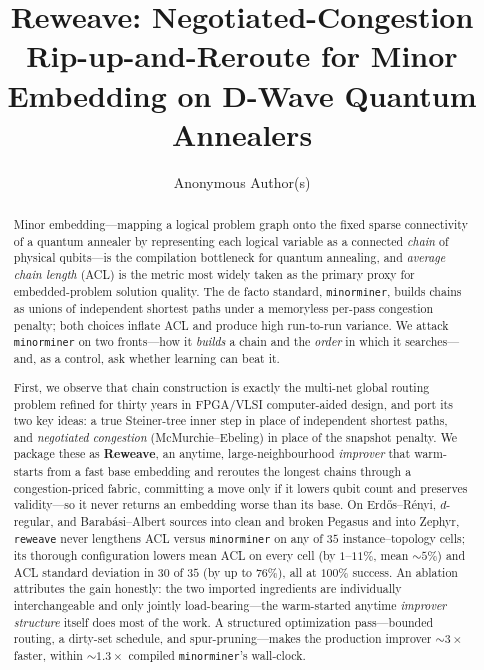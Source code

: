 \documentclass[acmsmall,anonymous,nonacm]{acmart}
\begin{document}
\title{Reweave: Negotiated-Congestion Rip-up-and-Reroute for Minor Embedding
on D-Wave Quantum Annealers}

\author{Anonymous Author(s)}

\begin{abstract}
Minor embedding---mapping a logical problem graph onto the fixed sparse
connectivity of a quantum annealer by representing each logical variable as a
connected \emph{chain} of physical qubits---is the compilation bottleneck for
quantum annealing, and \emph{average chain length} (ACL) is the metric most
widely taken as the primary proxy for embedded-problem solution quality. The de
facto standard, \texttt{minorminer}, builds chains as unions of independent
shortest paths under a memoryless per-pass congestion penalty; both choices
inflate ACL and produce high run-to-run variance. We attack \texttt{minorminer}
on two fronts---how it \emph{builds} a chain and the \emph{order} in which it
searches---and, as a control, ask whether learning can beat it.

First, we observe that chain construction is exactly the multi-net global routing
problem refined for thirty years in FPGA/VLSI computer-aided design, and port its
two key ideas: a true Steiner-tree inner step in place of independent shortest
paths, and \emph{negotiated congestion} (McMurchie--Ebeling) in place of the
snapshot penalty. We package these as \textbf{Reweave}, an anytime,
large-neighbourhood \emph{improver} that warm-starts from a fast base embedding
and reroutes the longest chains through a congestion-priced fabric, committing a
move only if it lowers qubit count and preserves validity---so it never returns an
embedding worse than its base. On Erd\H{o}s--R\'enyi, $d$-regular, and
Barab\'asi--Albert sources into clean and broken Pegasus and into Zephyr,
\texttt{reweave} never lengthens ACL versus \texttt{minorminer} on any of $35$
instance--topology cells; its thorough configuration lowers mean ACL on every cell
(by $1$--$11\%$, mean ${\sim}5\%$) and ACL standard deviation in $30$ of $35$ (by
up to $76\%$), all at $100\%$ success. An ablation attributes the gain honestly:
the two imported ingredients are individually interchangeable and only jointly
load-bearing---the warm-started anytime \emph{improver structure} itself does most
of the work. A structured optimization pass---bounded
routing, a dirty-set schedule, and spur-pruning---makes the production improver
${\sim}3\times$ faster, within ${\sim}1.3\times$ compiled \texttt{minorminer}'s
wall-clock.


\end{abstract}
\end{document}
